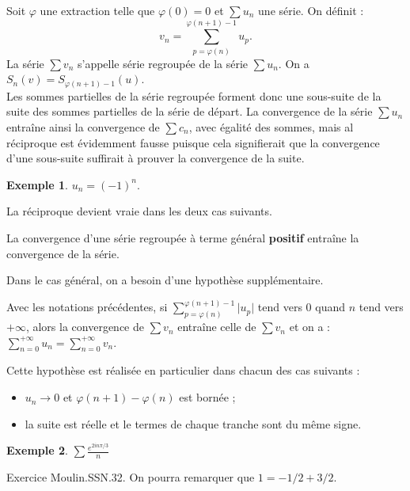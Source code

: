 \documentclass[french]{article}
\theoremstyle{plain}
\theoremstyle{definition}
\newtheorem*{ex}{Exemple}
\theoremstyle{remark}
\begin{document}
Soit $\varphi$ une extraction telle que $\varphi(0)=0$ et $\displaystyle\sum u_n$ une série. On définit : $$v_n=\sum_{p=\varphi(n)}^{\varphi(n+1)-1}u_p.$$
La série $\displaystyle\sum v_n$ s'appelle série regroupée de la série $\displaystyle\sum u_n$. On a $S_n(v)=S_{\varphi(n+1)-1}(u)$. \\
Les sommes partielles de la série regroupée forment donc une sous-suite de la suite des sommes partielles de la série de départ. La convergence de la série $\displaystyle\sum u_n$ entraîne ainsi la convergence de $\displaystyle\sum c_n$, avec égalité des sommes, mais al réciproque est évidemment fausse puisque cela signifierait que la convergence d'une sous-suite suffirait à prouver la convergence de la suite.

\begin{ex}
	$u_n=(-1)^n$.
\end{ex}

La réciproque devient vraie dans les deux cas suivants.

\begin{prop}[]%
	La convergence d'une série regroupée à terme général \textbf{positif} entraîne la convergence de la série.
\end{prop}

Dans le cas général, on a besoin d'une hypothèse supplémentaire.

\begin{prop}%
	Avec les notations précédentes, si $\displaystyle\sum_{p=\varphi(n)}^{\varphi(n+1)-1}\lvert u_p\rvert$ tend vers $0$ quand $n$ tend vers $+\infty$, alors la convergence de $\displaystyle\sum v_n$ entraîne celle de $\displaystyle\sum v_n$ et on a : $\displaystyle\sum_{n=0}^{+\infty}u_n=\sum_{n=0}^{+\infty}v_n$.
\end{prop}

Cette hypothèse est réalisée en particulier dans chacun des cas suivants :
\begin{itemize}
	\item $u_n\to 0$ et $\varphi(n+1)-\varphi(n)$ est bornée ;
	\item la suite est réelle et le termes de chaque tranche sont du même signe. %
\end{itemize}

\begin{ex}
	$\displaystyle\sum\frac{e^{2in\pi/3}}{n}$
\end{ex}

Exercice Moulin.SSN.32. On pourra remarquer que $1=-1/2+3/2$.
\end{document}
